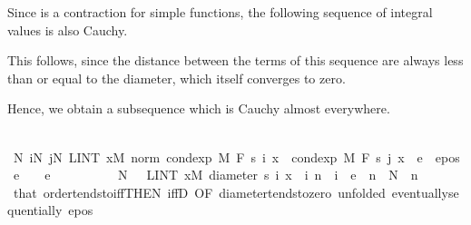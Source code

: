\begin{isabellebody}
\begin{isamarkuptext}%
Since  is a contraction for simple functions, the following sequence of integral values is also Cauchy.%
\end{isamarkuptext}\isamarkuptrue%
%
\begin{isamarkuptext}%
This follows, since the distance between the terms of this sequence are always less than or equal to the diameter, which itself converges to zero.%
\end{isamarkuptext}\isamarkuptrue%
%
\begin{isamarkuptext}%
Hence, we obtain a subsequence which is Cauchy almost everywhere.%
\end{isamarkuptext}\isamarkuptrue%
\ \ \isamarkupfalse%
\ {\isachardoublequoteopen}{\isasymexists}N{\isachardot}{\kern0pt}\ {\isasymforall}i{\isasymge}N{\isachardot}{\kern0pt}\ {\isasymforall}j{\isasymge}N{\isachardot}{\kern0pt}\ LINT\ x{\isacharbar}{\kern0pt}M{\isachardot}{\kern0pt}\ norm\ {\isacharparenleft}{\kern0pt}cond{\isacharunderscore}{\kern0pt}exp\ M\ F\ {\isacharparenleft}{\kern0pt}s\ i{\isacharparenright}{\kern0pt}\ x\ {\isacharminus}{\kern0pt}\ cond{\isacharunderscore}{\kern0pt}exp\ M\ F\ {\isacharparenleft}{\kern0pt}s\ j{\isacharparenright}{\kern0pt}\ x{\isacharparenright}{\kern0pt}\ {\isacharless}{\kern0pt}\ e{\isachardoublequoteclose}\ \ e{\isacharunderscore}{\kern0pt}pos{\isacharcolon}{\kern0pt}\ {\isachardoublequoteopen}e\ {\isachargreater}{\kern0pt}\ {}{\isachardoublequoteclose}\ \ e\isanewline
\ \ \isamarkupfalse%
\ {\isacharminus}{\kern0pt}\isanewline
\ \ \ \ \isamarkupfalse%
\ N\ \ {\isacharasterisk}{\kern0pt}{\isacharcolon}{\kern0pt}\ {\isachardoublequoteopen}LINT\ x{\isacharbar}{\kern0pt}M{\isachardot}{\kern0pt}\ diameter\ {\isacharbraceleft}{\kern0pt}s\ i\ x\ {\isacharbar}{\kern0pt}\ i{\isachardot}{\kern0pt}\ n\ {\isasymle}\ i{\isacharbraceright}{\kern0pt}\ {\isacharless}{\kern0pt}\ e{\isachardoublequoteclose}\ \ {\isachardoublequoteopen}n\ {\isasymge}\ N{\isachardoublequoteclose}\ \ n\ \isamarkupfalse%
\ that\ order{\isacharunderscore}{\kern0pt}tendsto{\isacharunderscore}{\kern0pt}iff{\isacharbrackleft}{\kern0pt}THEN\ iffD{}{\isacharcomma}{\kern0pt}\ OF\ diameter{\isacharunderscore}{\kern0pt}tendsto{\isacharunderscore}{\kern0pt}zero{\isacharcomma}{\kern0pt}\ unfolded\ eventually{\isacharunderscore}{\kern0pt}sequentially{\isacharbrackright}{\kern0pt}\ e{\isacharunderscore}{\kern0pt}pos\ \isamarkupfalse%

\end{isabellebody}
